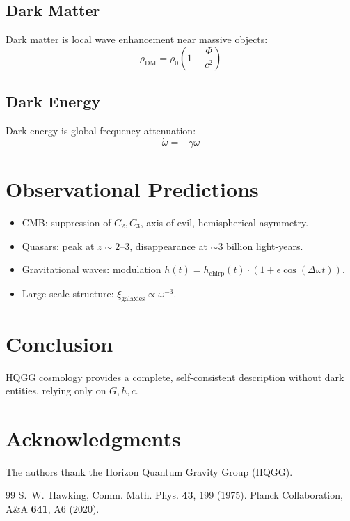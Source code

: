 \documentclass[12pt,a4paper]{article}
\begin{document}
\subsection{Dark Matter}

Dark matter is local wave enhancement near massive objects:
\[
\rho_{\text{DM}} = \rho_0 \left(1 + \frac{\Phi}{c^2}\right)
\]

\subsection{Dark Energy}

Dark energy is global frequency attenuation:
\[
\dot{\omega} = -\gamma \omega
\]

\section{Observational Predictions}

\begin{itemize}
\item CMB: suppression of \(C_2, C_3\), axis of evil, hemispherical asymmetry.
\item Quasars: peak at \(z \sim 2\)–3, disappearance at \( \sim 3\) billion light-years.
\item Gravitational waves: modulation \(h(t) = h_{\text{chirp}}(t) \cdot (1 + \epsilon \cos(\Delta \omega t))\).
\item Large-scale structure: \(\xi_{\text{galaxies}} \propto \omega^{-3}\).
\end{itemize}

\section{Conclusion}

HQGG cosmology provides a complete, self-consistent description without dark entities, relying only on \(G, \hbar, c\).

\begin{center}
\end{center}

\section*{Acknowledgments}

The authors thank the Horizon Quantum Gravity Group (HQGG).

\begin{thebibliography}{99}
 S.~W.~Hawking, Comm. Math. Phys. \textbf{43}, 199 (1975).
 Planck Collaboration, A\&A \textbf{641}, A6 (2020).
\end{thebibliography}
\end{document}
